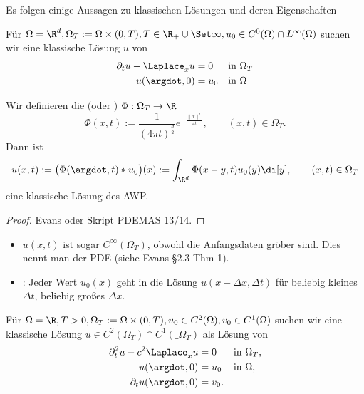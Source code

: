 Es folgen einige Aussagen zu klassischen Lösungen und deren Eigenschaften

\begin{df} \label{1.19}
	Für $\Omega = \R^d, \Omega_T := \Omega \times (0, T), T \in \R_+ \cup \Set \infty, u_0 \in C^0(\Omega) \cap L^\infty(\Omega)$ suchen wir eine klassische Lösung $u$ von
	\begin{align*}
		\partial_t u - \Laplace_x u &= 0  &&\text{in $\Omega_T$}\\
		u(\argdot, 0) &= u_0  &&\text{in $\Omega$}
	\end{align*}
\end{df}

\begin{st} \label{1.20}
	Wir definieren die  (oder ) $\Phi: \Omega_T \to \R$
	\[
		\Phi(x,t) := \frac{1}{(4\pi t)^{\frac{d}{2}}} e^{- \frac{\|x\|^2}{4t}},
		\qquad (x,t) \in \Omega_T.
	\]
	Dann ist
	\[
		u(x,t) := \big(\Phi(\argdot, t) \ast u_0\big) (x) := \int_{\R^d} \Phi(x-y, t) u_0(y) \di[y],
		\qquad (x,t) \in \Omega_T
	\]
	eine klassische Lösung des AWP.
	\begin{proof}
		Evans oder Skript PDEMAS 13/14.
	\end{proof}
	\begin{note}
		\begin{itemize}
			\item
				$u(x,t)$ ist sogar $C^\infty(\Omega_T)$, obwohl die Anfangsdaten gröber sind.
				Dies nennt man  der PDE (siehe Evans §2.3 Thm 1).
			\item
				: Jeder Wert $u_0(x)$ geht in die Lösung $u(x + \Delta x, \Delta t)$ für beliebig kleines $\Delta t$, beliebig großes $\Delta x$.
		\end{itemize}
	\end{note}
\end{st}

\begin{df}[AWP für Wellengleichung, $d = 1$] \label{1.21}
	Für $\Omega = \R, T > 0, \Omega_T := \Omega \times (0, T), u_0 \in C^2(\Omega), v_0 \in C^1(\Omega)$ suchen wir eine klassische Lösung $u \in C^2(\Omega_T) \cap C^1(\_{\Omega_T})$ als Lösung von
	\begin{align*}
		\partial_t^2 u - c^2 \Laplace_x u &= 0 &&\text{in $\Omega_T$}, \\
		u(\argdot, 0) &= u_0  && \text{in $\Omega$}, \\
		\partial_t u(\argdot, 0) &= v_0.
	\end{align*}
\end{df}

